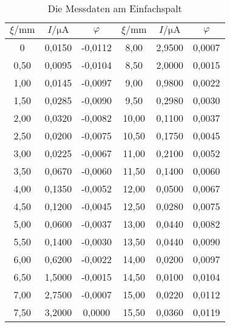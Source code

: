 \begin{table}[H]
    \centering
    \caption{Die Messdaten am Einfachspalt}
    \label{tab:einzel}
    \begin{tabular}{| c | c |c||c|c|c| }
    \toprule
    $\xi/\mathrm{mm}$ &$I/\mathrm{\mu A}$  &  $\varphi$&$\xi/\mathrm{mm}$ &$I/\mathrm{\mu A}$  &  $\varphi$ \\
    \midrule
    0	    & 0,0150	& -0,0112   &  8,00   &    2,9500  & 0,0007\\   
    0,50	& 0,0095	& -0,0104   &  8,50   &    2,0000  & 0,0015\\ 
    1,00	& 0,0145	& -0,0097   &  9,00   &    0,9800  & 0,0022\\
    1,50	& 0,0285	& -0,0090   &  9,50   &    0,2980  & 0,0030\\
    2,00	& 0,0320	& -0,0082   &  10,00  &    0,1100  & 0,0037\\
    2,50	& 0,0200	& -0,0075   &  10,50  &    0,1750  & 0,0045\\
    3,00	& 0,0225	& -0,0067   &  11,00  &    0,2100  & 0,0052\\
    3,50	& 0,0670	& -0,0060   &  11,50  &    0,1400  & 0,0060\\
    4,00	& 0,1350	& -0,0052   &  12,00  &    0,0500  & 0,0067\\
    4,50	& 0,1200	& -0,0045   &  12,50  &    0,0280  & 0,0075\\
    5,00	& 0,0600	& -0,0037   &  13,00  &    0,0440  & 0,0082\\
    5,50	& 0,1400	& -0,0030   &  13,50  &    0,0440  & 0,0090\\
    6,00	& 0,6200	& -0,0022   &  14,00  &    0,0200  & 0,0097\\
    6,50	& 1,5000	& -0,0015   &  14,50  &    0,0100  & 0,0104\\
    7,00	& 2,7500	& -0,0007   &  15,00  &    0,0220  & 0,0112\\
    7,50	& 3,2000	& 0,0000    &  15,50  &    0,0360  & 0,0119\\

    \bottomrule
    \end{tabular}
  \end{table}
  \noindent

